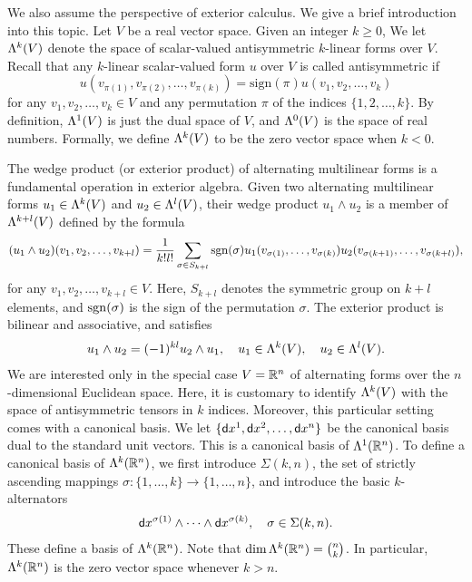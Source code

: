 \documentclass[a4paper]{article}
\begin{document}
We also assume the perspective of exterior calculus. 
We give a brief introduction into this topic. 
Let $V$ be a real vector space. 
Given an integer $k \geq 0$, We let $\Lambda^{k}(V)$ denote the space of scalar-valued antisymmetric $k$-linear forms over $V$. 
Recall that any $k$-linear scalar-valued form $u$ over $V$ is called antisymmetric
if 
\[ 
    u( v_{\pi(1)}, v_{\pi(2)}, \ldots, v_{\pi(k)} ) 
    = 
    \text{sign}(\pi) 
    u( v_1, v_2, \ldots, v_k ) 
\]
for any $v_1, v_2, \dots, v_k \in V$ and any permutation $\pi$ of the indices \(\{1, 2, \ldots, k\}\). 
By definition, $\Lambda^{1}(V)$ is just the dual space of $V$, and $\Lambda^{0}(V)$ is the space of real numbers. 
Formally, we define $\Lambda^{k}(V)$ to be the zero vector space when $k < 0$. 

The wedge product (or exterior product) of alternating multilinear forms is a fundamental operation in exterior algebra. 
Given two alternating multilinear forms \( u_1 \in \Lambda^{k}(V) \) and \( u_2 \in \Lambda^{l}(V) \), 
their wedge product \( u_1 \wedge u_2 \) is a member of $\Lambda^{k+l}(V)$
defined by the formula 
\[
    (u_1 \wedge u_2)(v_1, v_2, \ldots, v_{k+l}) 
    = 
    \frac{1}{k! l!} 
    \sum_{ \sigma \in S_{k+l}} 
    \operatorname{sgn}(\sigma) 
    u_1( v_{\sigma(  1)}, \ldots, v_{\sigma(k  )} ) 
    u_2( v_{\sigma(k+1)}, \ldots, v_{\sigma(k+l)} ),
\]
for any \( v_1, v_2, \ldots, v_{k+l} \in V \).
Here, \( S_{k+l} \) denotes the symmetric group on \( k+l \) elements, and \( \operatorname{sgn}(\sigma) \) is the sign of the permutation \( \sigma \). The exterior product is bilinear and associative, and satisfies 
\begin{align*}
    u_1 \wedge u_2 = (-1)^{kl} u_2 \wedge u_1,
    \quad 
    u_1 \in \Lambda^{k}(V),
    \quad 
    u_2 \in \Lambda^{l}(V).
\end{align*}
We are interested only in the special case $V = {\mathbb R}^{n}$ of alternating forms over the $n$-dimensional Euclidean space. 
Here, it is customary to identify $\Lambda^{k}(V)$ with the space of antisymmetric tensors in $k$ indices. 
Moreover, this particular setting comes with a canonical basis. 
We let \(\{{\mathsf d}x^1, {\mathsf d}x^2, \ldots, {\mathsf d}x^{n}\}\) be the canonical basis dual to the standard unit vectors.
This is a canonical basis of $\Lambda^{1}({\mathbb R}^{n})$. 
To define a canonical basis of $\Lambda^{k}({\mathbb R}^{n})$, 
we first introduce $\Sigma(k,n)$, the set of strictly ascending mappings $\sigma : \{1,\dots,k\} \rightarrow \{1,\dots,n\}$,
and introduce the basic $k$-alternators 
\begin{align*}
    {\mathsf d}x^{\sigma(1)} \wedge \dots \wedge {\mathsf d}x^{\sigma(k)}, \quad \sigma \in \Sigma(k,n). 
\end{align*}
These define a basis of $\Lambda^{k}({\mathbb R}^{n})$.
Note that 
$\dim \Lambda^{k}({\mathbb R}^{n}) = \binom{n}{k}$. 
In particular, $\Lambda^{k}({\mathbb R}^{n})$ is the zero vector space whenever $k > n$.
\end{document}
